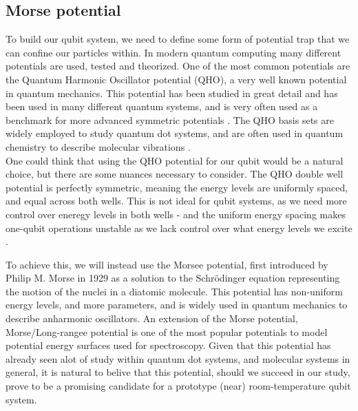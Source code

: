 \documentclass{subfiles}
\begin{document}
\subsection{Morse potential}\label{sec:morse_potential}
To build our qubit system, we need to define some form of potential trap that we can confine our particles within. In modern quantum computing many different potentials are used, tested and theorized. One of the most common potentials are the Quantum Harmonic Oscillator potential (QHO), a very well known potential in quantum mechanics. This potential has been studied in great detail and has been used in many different quantum systems, and is very often used as a benchmark for more advanced symmetric potentials \cite{griffiths2018introduction, berera2021quantum}. The QHO basis sets are widely employed to study quantum dot systems\cite{Yuan_2017}, and are often used in quantum chemistry to describe molecular vibrations \cite{atkins2011molecular}. 
\\ 

One could think that using the QHO potential for our qubit would be a natural choice, but there are some nuances necessary to consider. The QHO double well potential is perfectly symmetric, meaning the energy levels are uniformly spaced, and equal across both wells. This is not ideal for qubit systems, as we need more control over eneregy levels in both wells - and the uniform energy spacing makes one-qubit operations unstable as we lack control over what energy levels we excite \cite{devoret2013superconducting}. 

To achieve this, we will instead use the Morsee potential, first introduced by Philip M. Morse in 1929 as a solution to the Schrödinger equation representing the motion of the nuclei in a diatomic molecule\cite{morse1929diatomic}. This potential has non-uniform energy levels, and more parameters, and is widely used in quantum mechanics to describe anharmonic oscillators. An extension of the Morse potential, Morse/Long-rangee potential is one of the most popular potentials to model potential energy surfaces used for spectroscopy\cite{zhai2018constructing}. Given that this potential has already seen alot of study within quantum dot systems, and molecular systems in general, it is natural to belive that this potential, should we succeed in our study, prove to be a promising candidate for a prototype (near) room-temperature qubit system\cite{khordad2014linear, hayrapetyan2015exciton, sargsian2021effects}. \\
\end{document}
